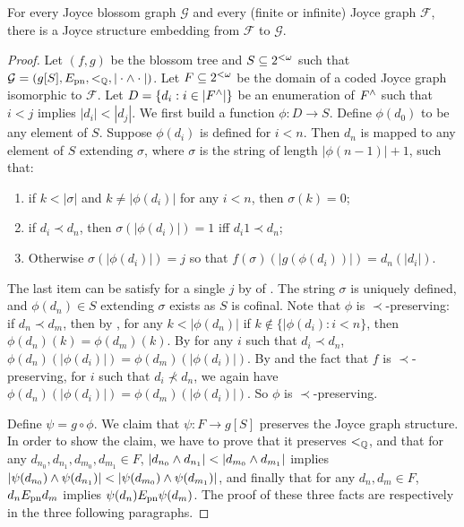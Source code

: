 \begin{theorem}[$\RCA_0$]\label{thm:joyce-to-rado-blossom}
For every Joyce blossom graph $\mathcal{G}$
and every (finite or infinite) Joyce graph $\mathcal{F}$,
there is a Joyce structure embedding from $\mathcal{F}$ to $\mathcal{G}$.
\end{theorem}
\begin{proof}
Let $(f, g)$ be the blossom tree and $S\subseteq{2^{<\omega}}$ such that $\mathcal{G} = (g[S], E_{\mathrm{pn}}, <_{\mathbb{Q}}, |\cdot \wedge \cdot|)$.
  Let $F\subseteq{2^{<\omega}}$ be the domain of a coded Joyce graph isomorphic to $\mathcal{F}$. Let $D=\{d_i:i\in|{F}^{\wedge}|\}$ be an enumeration of ${F}^{\wedge}$ such that $i<j$ implies $|d_i|<|d_j|$. We first build a function $\phi:D\to S$. Define $\phi(d_0)$ to be any element of $S$. Suppose $\phi(d_i)$ is defined for $i<n$. Then $d_n$ is mapped to any element of $S$ extending $\sigma$, where $\sigma$ is the string of length $|\phi(n-1)|+1$, such that:
  \begin{enumerate}
  \item\label{it:jtrb0} if $k<|\sigma|$ and $k\neq|\phi(d_i)|$ for any $i<n$, then $\sigma(k)=0$;
  \item\label{it:jtrb1} if $d_i\prec d_n$, then $\sigma(|\phi(d_i)|)=1$ iff $d_i1\prec d_n$;
  \item\label{it:jtrb2} Otherwise $\sigma(|\phi(d_i)|)=j$ so that $f(\sigma)(|g(\phi(d_i))|)=d_n(|d_i|)$.
  \end{enumerate}
  The last item can be satisfy for a single $j$ by  of . The string $\sigma$ is uniquely defined, and $\phi(d_n)\in S$ extending $\sigma$ exists as $S$ is cofinal. Note that $\phi$ is $\prec$-preserving: if $d_n\prec d_m$, then by , for any $k<|\phi(d_n)|$ if $k\not\in\{|\phi(d_i):i<n\}$, then $\phi(d_n)(k)=\phi(d_m)(k)$. By  for any $i$ such that $d_i\prec d_n$, $\phi(d_n)(|\phi(d_i)|)=\phi(d_m)(|\phi(d_i)|)$. By  and the fact that $f$ is $\prec$-preserving, for $i$ such that $d_i\not\prec d_n$, we again have $\phi(d_n)(|\phi(d_i)|)=\phi(d_m)(|\phi(d_i)|)$. So $\phi$ is $\prec$-preserving.

  Define $\psi = g\circ\phi$. We claim that $\psi:F\to g[S]$ preserves the Joyce graph structure. In order to show the claim, we have to prove that it preserves $<_{\mathbb{Q}}$, and that for any $d_{n_0},d_{n_1},d_{m_0},d_{m_1}\in F$, $|d_{n_0}\meet d_{n_1}|<|d_{m_0}\meet d_{m_1}|$ implies $|\psi(d_{n_0})\meet \psi(d_{n_1})|<|\psi(d_{m_0})\meet \psi(d_{m_1})|$, and finally that for any $d_n,d_m\in F$, $d_nE_{\mathrm{pn}} d_m$ implies $\psi(d_n)E_{\mathrm{pn}} \psi(d_m)$. The proof of these three facts are respectively in the three following paragraphs.
  

\end{proof}

